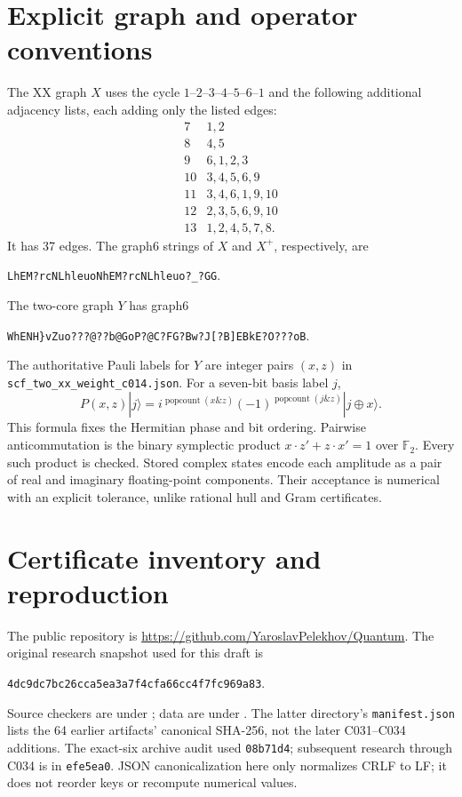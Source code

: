 \documentclass[11pt,a4paper]{article}
\theoremstyle{remark}\newtheorem{remark}[theorem]{Remark}
\newcommand{\F}{\mathbb F}
\newcommand{\artifact}[1]{\nolinkurl{#1}}
\begin{document}
\appendix
\section{Explicit graph and operator conventions}\label{app:graphs}
The XX graph $X$ uses the cycle $1$--$2$--$3$--$4$--$5$--$6$--$1$
and the following additional adjacency lists, each adding only the
listed edges:
\[
\begin{array}{c|l}
7&1,2\\8&4,5\\9&6,1,2,3\\10&3,4,5,6,9\\
11&3,4,6,1,9,10\\12&2,3,5,6,9,10\\13&1,2,4,5,7,8.
\end{array}
\]
It has 37 edges. The graph6 strings of $X$ and $X^+$, respectively, are
\begin{center}\verb|LhEM?rcNLhleuo|\qquad\verb|NhEM?rcNLhleuo?_?GG|.\end{center}
The two-core graph $Y$ has graph6
\begin{center}\small\verb|WhENH}vZuo???@??b@GoP?@C?FG?Bw?J[?B]EBkE?O???oB|.\end{center}
The authoritative Pauli labels for $Y$ are integer pairs $(x,z)$ in
\artifact{scf_two_xx_weight_c014.json}. For a seven-bit basis label $j$,
\[
 P(x,z)|j\rangle=i^{\operatorname{popcount}(x\mathbin{\&}z)}
 (-1)^{\operatorname{popcount}(j\mathbin{\&}z)}|j\mathbin{\oplus}x\rangle.
\]
This formula fixes the Hermitian phase and bit ordering. Pairwise
anticommutation is the binary symplectic product
$x\cdot z'+z\cdot x'=1$ over $\F_2$. Every such product is checked.
Stored complex states encode each amplitude as a pair of real and
imaginary floating-point components. Their acceptance is numerical
with an explicit tolerance, unlike rational hull and Gram certificates.

\section{Certificate inventory and reproduction}\label{app:reproduction}
The public repository is \url{https://github.com/YaroslavPelekhov/Quantum}.
The original research snapshot used for this draft is
\begin{center}\small\texttt{4dc9dc7bc26cca5ea3a7f4cfa66cc4f7fc969a83}.\end{center}
Source checkers are under
; data are under
.
The latter directory's \artifact{manifest.json} lists the 64 earlier
artifacts' canonical SHA-256, not the later C031--C034 additions. The
exact-six archive audit used \texttt{08b71d4}; subsequent research through
C034 is in \texttt{efe5ea0}. JSON canonicalization here only normalizes CRLF to
LF; it does not reorder keys or recompute numerical values.
\end{document}
